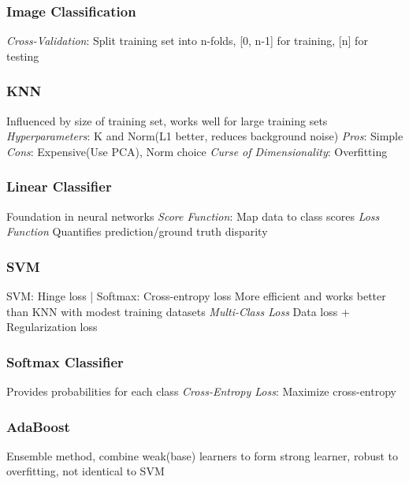\documentclass{article}
\begin{document}
\begin{multicols*}{2}
        \subsubsection*{Image Classification}
        \textit{Cross-Validation}: Split training set into n-folds, [0, n-1] for training, [n] for
        testing
        \subsubsection*{KNN}
        Influenced by size of training set, works well for large training sets\newline
        \textit{Hyperparameters}: K and Norm(L1 better, reduces background noise)\newline
        \textit{Pros}: Simple\newline
        \textit{Cons}: Expensive(Use PCA), Norm choice\newline
        \textit{Curse of Dimensionality}: Overfitting
        \subsubsection*{Linear Classifier}
        Foundation in neural networks\newline
        \textit{Score Function}: Map data to class scores\newline
        \textit{Loss Function} Quantifies prediction/ground truth disparity
        \subsubsection*{SVM}
        SVM: Hinge loss | Softmax: Cross-entropy loss\newline
        More efficient and works better than KNN with modest training datasets\newline
        \textit{Multi-Class Loss} Data loss + Regularization loss
        \subsubsection*{Softmax Classifier}
        Provides probabilities for each class\newline
        \textit{Cross-Entropy Loss}: Maximize cross-entropy
        \subsubsection*{AdaBoost}
        Ensemble method, combine weak(base) learners to form strong learner, robust to
        overfitting, not identical to SVM

\end{multicols*}
\end{document}
